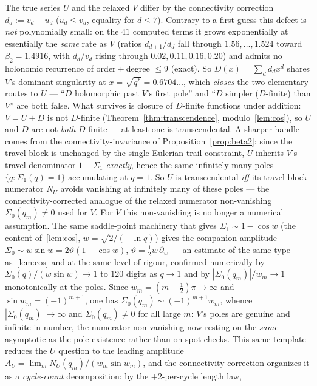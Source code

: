 \documentclass[11pt,a4paper]{article}
\theoremstyle{remark}
\theoremstyle{plain}
\begin{document}
The true series $U$ and the relaxed $V$ differ by the connectivity
correction $d_d := v_d - u_d$ ($u_d \le v_d$, equality for $d \le 7$).
Contrary to a first guess this defect is \emph{not} polynomially small: on
the $41$ computed terms it grows exponentially at essentially the
\emph{same} rate as $V$ (ratios $d_{d+1}/d_d$ fall through
$1.56, \ldots, 1.524$ toward $\beta_2 = 1.4916$, with $d_d/v_d$ rising
through $0.02, 0.11, 0.16, 0.20$) and admits no holonomic recurrence of
order${}+{}$degree $\le 9$ (exact).  So $D(x) = \sum_d d_d x^d$ shares
$V$'s dominant singularity at $x = \sqrt{q^*} = 0.6704\ldots$, which
\emph{closes} the two elementary routes to $U$ --- ``$D$ holomorphic past
$V$'s first pole'' and ``$D$ simpler ($D$-finite) than $V$'' are both
false.  What survives is closure of $D$-finite functions under addition:
$V = U + D$ is not $D$-finite (Theorem~\ref{thm:transcendence},
modulo~\eqref{lem:cos}), so $U$ and $D$ are not \emph{both} $D$-finite ---
at least one is transcendental.  A sharper handle comes from the
connectivity-invariance of Proposition~\ref{prop:beta2}: since the travel
block is unchanged by the single-Eulerian-trail constraint, $U$ inherits
$V$'s travel denominator $1-\Sigma_1$ \emph{exactly}, hence the same
infinitely many poles $\{q : \Sigma_1(q)=1\}$ accumulating at $q=1$.  So $U$
is transcendental \emph{iff} its travel-block numerator $N_U$ avoids
vanishing at infinitely many of these poles --- the connectivity-corrected
analogue of the relaxed numerator non-vanishing $\Sigma_0(q_m) \ne 0$ used
for $V$.  For $V$ this non-vanishing is no longer a numerical assumption.
The same saddle-point machinery that gives $\Sigma_1 \sim 1-\cos w$
(the content of~\eqref{lem:cos}, $w=\sqrt{2/(-\ln q)}$) gives the companion
amplitude $\Sigma_0 \sim w\sin w = 2\vartheta(1-\cos w)$,
$\vartheta=\tfrac12 w\,\partial_w$ --- an estimate of the same type as~\eqref{lem:cos}
and at the same level of rigour, confirmed numerically by
$\Sigma_0(q)/(w\sin w)\to1$ to $120$ digits as $q\to1$ and by
$|\Sigma_0(q_m)|/w_m\to1$ monotonically at the poles.  Since
$w_m=(m-\tfrac12)\pi\to\infty$ and $\sin w_m=(-1)^{m+1}$, one has
$\Sigma_0(q_m)\sim(-1)^{m+1}w_m$, whence $|\Sigma_0(q_m)|\to\infty$ and
$\Sigma_0(q_m)\ne0$ for all large $m$: $V$'s poles are genuine and infinite in
number, the numerator non-vanishing now resting on the \emph{same} asymptotic
as the pole-existence rather than on spot checks.
This same template reduces the $U$ question to the leading amplitude
$A_U = \lim_m N_U(q_m)/(w_m\sin w_m)$, and the connectivity correction organizes
it as a \emph{cycle-count} decomposition: by the $+2$-per-cycle length law,
\end{document}
